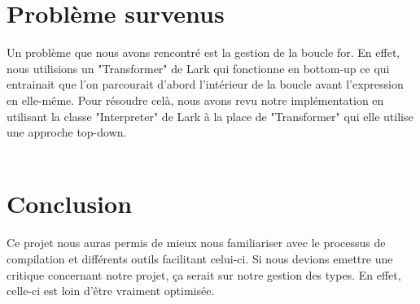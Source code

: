 \documentclass[a4paper, 12pt]{article}
\begin{document}
\section{Problème survenus}

Un problème que nous avons rencontré est la gestion de la boucle for. En effet, nous utilisions un "Transformer" de Lark qui fonctionne en bottom-up ce qui entrainait que l'on parcourait d'abord l'intérieur de la boucle avant l'expression en elle-même. Pour résoudre celà, nous avons revu notre implémentation en utilisant la classe "Interpreter" de Lark à la place de "Transformer" qui elle utilise une approche top-down.
\\
\\



\section{Conclusion}

Ce projet nous auras permis de mieux nous familiariser avec le processus de compilation et différents outils facilitant celui-ci. Si nous devions emettre une critique concernant notre projet, ça serait sur notre gestion des types. En effet, celle-ci est loin d'être vraiment optimisée.
\end{document}
